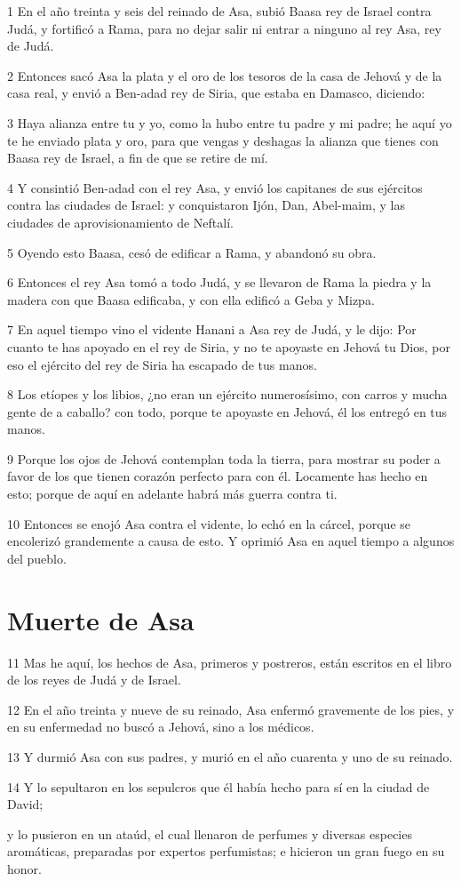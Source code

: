 \par 1 En el año treinta y seis del reinado de Asa, subió Baasa rey de Israel contra Judá, y fortificó a Rama, para no dejar salir ni entrar a ninguno al rey Asa, rey de Judá.
\par 2 Entonces sacó Asa la plata y el oro de los tesoros de la casa de Jehová y de la casa real, y envió a Ben-adad rey de Siria, que estaba en Damasco, diciendo:
\par 3 Haya alianza entre tu y yo, como la hubo entre tu padre y mi padre; he aquí yo te he enviado plata y oro, para que vengas y deshagas la alianza que tienes con Baasa rey de Israel, a fin de que se retire de mí.
\par 4 Y consintió Ben-adad con el rey Asa, y envió los capitanes de sus ejércitos contra las ciudades de Israel: y conquistaron Ijón, Dan, Abel-maim, y las ciudades de aprovisionamiento de Neftalí.
\par 5 Oyendo esto Baasa, cesó de edificar a Rama, y abandonó su obra.
\par 6 Entonces el rey Asa tomó a todo Judá, y se llevaron de Rama la piedra y la madera con que Baasa edificaba, y con ella edificó a Geba y Mizpa.
\par 7 En aquel tiempo vino el vidente Hanani a Asa rey de Judá, y le dijo: Por cuanto te has apoyado en el rey de Siria, y no te apoyaste en Jehová tu Dios, por eso el ejército del rey de Siria ha escapado de tus manos.
\par 8 Los etíopes y los libios, ¿no eran un ejército numerosísimo, con carros y mucha gente de a caballo? con todo, porque te apoyaste en Jehová, él los entregó en tus manos.
\par 9 Porque los ojos de Jehová contemplan toda la tierra, para mostrar su poder a favor de los que tienen corazón perfecto para con él. Locamente has hecho en esto; porque de aquí en adelante habrá más guerra contra ti.
\par 10 Entonces se enojó Asa contra el vidente, lo echó en la cárcel, porque se encolerizó grandemente a causa de esto. Y oprimió Asa en aquel tiempo a algunos del pueblo.

\section*{Muerte de Asa}

\par 11 Mas he aquí, los hechos de Asa, primeros y postreros, están escritos en el libro de los reyes de Judá y de Israel.
\par 12 En el año treinta y nueve de su reinado, Asa enfermó gravemente de los pies, y en su enfermedad no buscó a Jehová, sino a los médicos.
\par 13 Y durmió Asa con sus padres, y murió en el año cuarenta y uno de su reinado.
\par 14 Y lo sepultaron en los sepulcros que él había hecho para sí en la ciudad de David;
\par y lo pusieron en un ataúd, el cual llenaron de perfumes y diversas especies aromáticas, preparadas por expertos perfumistas; e hicieron un gran fuego en su honor.

